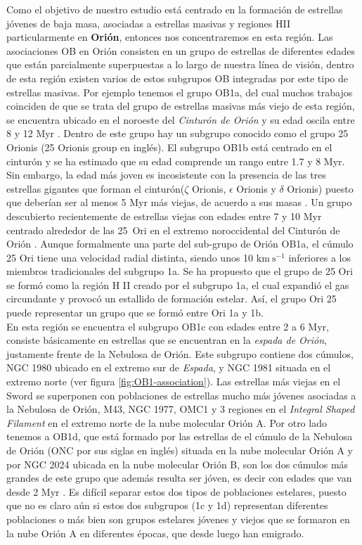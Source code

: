  Como el objetivo de nuestro estudio está centrado en la formación de estrellas jóvenes de baja masa, asociadas a estrellas masivas y regiones HII particularmente en \textbf{Orión}, entonces nos concentraremos en esta región. Las asociaciones OB en Orión consisten en un grupo de estrellas de diferentes edades que están parcialmente superpuestas a lo largo de nuestra línea de visión, dentro de esta región existen varios de estos subgrupos OB integradas por este tipo de estrellas masivas. Por ejemplo tenemos el grupo OB1a, del cual muchos trabajos coinciden de que se trata del grupo de estrellas masivas más viejo de esta región, se encuentra ubicado en el noroeste del \textit{Cinturón de Orión} y su edad oscila entre 8 y 12 Myr \citep{Blaauw:1991, Brown:1994}. Dentro de este grupo hay un subgrupo conocido como el grupo 25 Orionis (25 Orionis group en inglés). El subgrupo OB1b está centrado en el cinturón y se ha estimado que su edad comprende un rango entre 1.7 y 8 Myr. Sin embargo, la edad más joven es incosistente con la presencia de las tres estrellas gigantes que forman el cinturón(\(\zeta\) Orionis, \(\epsilon\) Orionis y \(\delta\) Orionis) puesto que deberían ser al menos 5 Myr más viejas, de acuerdo a sus masas \citep{Bally:2008a}. Un grupo descubierto recientemente de estrellas viejas con edades entre 7 y 10 Myr centrado alrededor de las 25~Ori en el extremo noroccidental del Cinturón de Orión \citep{Briceno:2007}. Aunque formalmente una parte del sub-grupo de Orión OB1a, el cúmulo 25 Ori tiene una velocidad radial distinta, siendo unos 10 \(\mathrm{km~s^{-1}}\) inferiores a los miembros tradicionales del subgrupo 1a. Se ha propuesto que el grupo de 25 Ori se formó como la región H II creado por el subgrupo 1a, el cual expandió el gas circundante y provocó un estallido de formación estelar. Así, el grupo Ori 25 puede representar un grupo que se formó entre Ori 1a y 1b.\\
  
En esta región se encuentra el subgrupo OB1c con edades entre 2 a 6 Myr, consiste básicamente en estrellas que se encuentran en la \textit{espada de Orión}, justamente frente de la Nebulosa de Orión. Este subgrupo contiene dos cúmulos, NGC 1980 ubicado en el extremo sur de \textit{Espada}, y NGC 1981 situada en el extremo norte (ver figura \ref{fig:OB1-association}). Las estrellas más viejas en el Sword se superponen con poblaciones de estrellas mucho más jóvenes asociadas a la Nebulosa de Orión, M43, NGC 1977, OMC1 y 3 regiones en el \textit{Integral Shaped Filament} en el extremo norte de la nube molecular Orión A. Por otro lado tenemos a OB1d, que está formado por las estrellas de el cúmulo de la Nebulosa de Orión (ONC por sus siglas en inglés) situada en la nube molecular Orión A y por NGC 2024 ubicada en la nube molecular Orión B, son los dos cúmulos más grandes de este grupo que además resulta ser jóven, es decir con edades que van desde 2 Myr \citep{Muench:2008a}. Es difícil separar estos dos tipos de poblaciones estelares, puesto que no es claro aún si estos dos subgrupos (1c y 1d) representan diferentes poblaciones o más bien son grupos estelares jóvenes y viejos que se formaron en la nube Orión A en diferentes épocas, que desde luego han emigrado.

